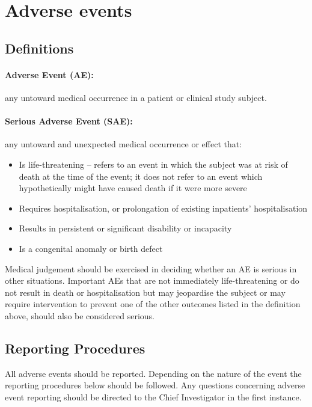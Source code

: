 \documentclass[a4paper,10pt]{article}
\begin{document}
\section{Adverse events}

\subsection{Definitions}

\paragraph{Adverse Event (AE):}any untoward medical occurrence in a patient or clinical study subject.  

\paragraph{Serious Adverse Event (SAE):}any untoward and unexpected medical occurrence or effect that: \begin{itemize}
	\item Is life-threatening – refers to an event in which the subject was at risk of death at the time of the event; it does not refer to an event which hypothetically might have caused death if it were more severe
	\item Requires hospitalisation, or prolongation of existing inpatients’ hospitalisation
    \item Results in persistent or significant disability or incapacity
	\item Is a congenital anomaly or birth defect
                                                                                              \end{itemize}

Medical judgement should be exercised in deciding whether an AE is serious in other situations. Important AEs that are not immediately life-threatening or do not result in death or hospitalisation but may jeopardise the subject or may require intervention to prevent one of the other outcomes listed in the definition above, should also be considered serious.

\subsection{Reporting Procedures}
All adverse events should be reported. Depending on the nature of the event the reporting procedures below should be followed. Any questions concerning adverse event reporting should be directed to the Chief Investigator in the first instance.  
\end{document}
